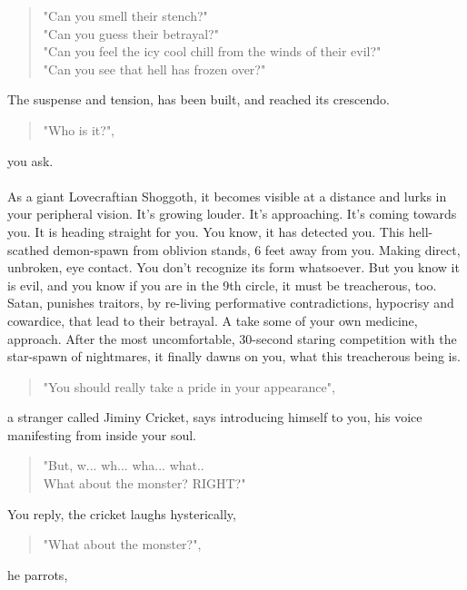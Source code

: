\documentclass[16pt,openany,oneside]{book}
\begin{document}
\begin{quote}
    "Can you smell their stench?" \\
    "Can you guess their betrayal?" \\
    "Can you feel the icy cool chill from the winds of their evil?" \\
    "Can you see that hell has frozen over?" 
\end{quote}

The suspense and tension, has been built, and reached its crescendo.

\begin{quote}
    "Who is it?", 
\end{quote}

you ask. 
\\\\
As a giant Lovecraftian Shoggoth, it becomes visible at a distance and lurks in your peripheral vision. It's growing louder. It's approaching. It's coming towards you. It is heading straight for you. You know, it has detected you. This hell-scathed demon-spawn from oblivion stands, 6 feet away from you. Making direct, unbroken, eye contact. You don't recognize its form whatsoever. But you know it is evil, and you know if you are in the 9th circle, it must be treacherous, too. Satan, punishes traitors, by re-living performative contradictions, hypocrisy and cowardice, that lead to their betrayal. A take some of your own medicine, approach. After the most uncomfortable, 30-second staring competition with the star-spawn of nightmares, it finally dawns on you, what this treacherous being is.

\begin{quote} 
   "You should really take a pride in your appearance", 
\end{quote}

a stranger called Jiminy Cricket, says introducing himself to you, his voice manifesting from inside your soul.

\begin{quote}
  "But, w... wh... wha... what.. \\
  What about the monster? RIGHT?" 
\end{quote}

You reply, the cricket laughs hysterically,

\begin{quote}
  "What about the monster?", 
\end{quote}

he parrots,
\end{document}
